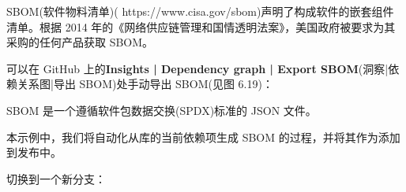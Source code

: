 
SBOM(软件物料清单)( https://www.cisa.gov/sbom)声明了构成软件的嵌套组件清单。根据 2014 年的《网络供应链管理和国情透明法案》，美国政府被要求为其采购的任何产品获取 SBOM。

可以在 GitHub 上的\textbf{Insights | Dependency graph | Export SBOM}(洞察|依赖关系图|导出 SBOM)处手动导出 SBOM(见图 6.19)：


SBOM 是一个遵循软件包数据交换(SPDX)标准的 JSON 文件。

本示例中，我们将自动化从库的当前依赖项生成 SBOM 的过程，并将其作为添加到发布中。


切换到一个新分支：



